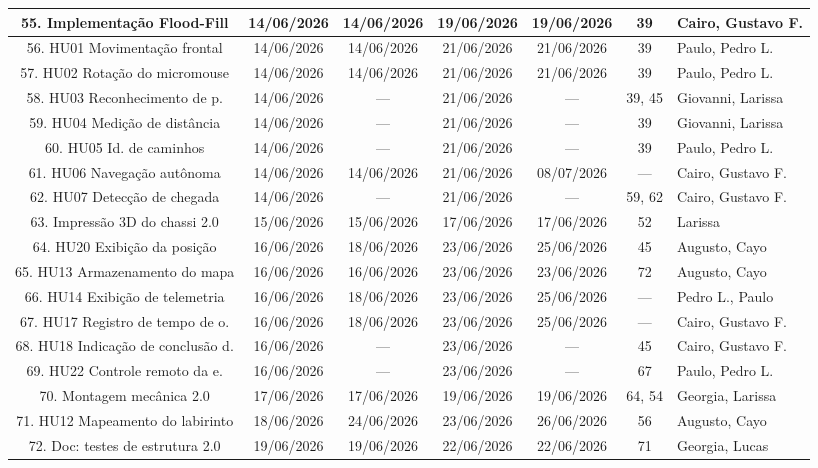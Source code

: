 \begin{landscape}
\begin{center}
\begin{longtable}{|c|c|c|c|c|c|p{3.6cm}|}
55. Implementação Flood-Fill & 14/06/2026 & 14/06/2026 & 19/06/2026 & 19/06/2026 & 39 & Cairo, Gustavo F. \\ \hline
56. HU01 Movimentação frontal & 14/06/2026 & 14/06/2026 & 21/06/2026 & 21/06/2026 & 39 & Paulo, Pedro L. \\ \hline
57. HU02 Rotação do micromouse & 14/06/2026 & 14/06/2026 & 21/06/2026 & 21/06/2026 & 39 & Paulo, Pedro L. \\ \hline
58. HU03 Reconhecimento de p. & 14/06/2026 & --- & 21/06/2026 & --- & 39, 45 & Giovanni, Larissa \\ \hline
59. HU04 Medição de distância & 14/06/2026 & --- & 21/06/2026 & --- & 39 & Giovanni, Larissa \\ \hline
60. HU05 Id. de caminhos & 14/06/2026 & --- & 21/06/2026 & --- & 39 & Paulo, Pedro L. \\ \hline
61. HU06 Navegação autônoma & 14/06/2026 & 14/06/2026 & 21/06/2026 & 08/07/2026 & --- & Cairo, Gustavo F. \\ \hline
62. HU07 Detecção de chegada & 14/06/2026 & --- & 21/06/2026 & --- & 59, 62 & Cairo, Gustavo F. \\ \hline
63. Impressão 3D do chassi 2.0 & 15/06/2026 & 15/06/2026 & 17/06/2026 & 17/06/2026 & 52 & Larissa \\ \hline
64. HU20 Exibição da posição & 16/06/2026 & 18/06/2026 & 23/06/2026 & 25/06/2026 & 45 & Augusto, Cayo \\ \hline
65. HU13 Armazenamento do mapa & 16/06/2026 & 16/06/2026 & 23/06/2026 & 23/06/2026 & 72 & Augusto, Cayo \\ \hline
66. HU14 Exibição de telemetria & 16/06/2026 & 18/06/2026 & 23/06/2026 & 25/06/2026 & --- & Pedro L., Paulo \\ \hline
67. HU17 Registro de tempo de o. & 16/06/2026 & 18/06/2026 & 23/06/2026 & 25/06/2026 & --- & Cairo, Gustavo F. \\ \hline
68. HU18 Indicação de conclusão d. & 16/06/2026 & --- & 23/06/2026 & --- & 45 & Cairo, Gustavo F. \\ \hline
69. HU22 Controle remoto da e. & 16/06/2026 & --- & 23/06/2026 & --- & 67 & Paulo, Pedro L. \\ \hline
70. Montagem mecânica 2.0 & 17/06/2026 & 17/06/2026 & 19/06/2026 & 19/06/2026 & 64, 54 & Georgia, Larissa \\ \hline
71. HU12 Mapeamento do labirinto & 18/06/2026 & 24/06/2026 & 23/06/2026 & 26/06/2026 & 56 & Augusto, Cayo \\ \hline
72. Doc: testes de estrutura 2.0 & 19/06/2026 & 19/06/2026 & 22/06/2026 & 22/06/2026 & 71 & Georgia, Lucas \\ \hline

\end{longtable}
\end{center}
\end{landscape}
